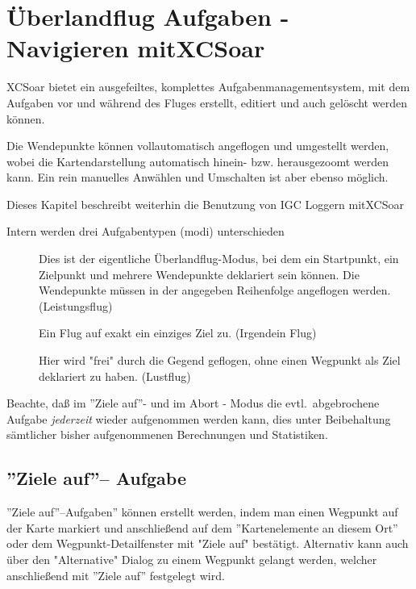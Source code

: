 \setcounter{chapter}{4}
\chapter{Überlandflug Aufgaben - Navigieren mit\textsf{XCSoar}}\label{cha:tasks}

\textsf{XCSoar} bietet ein ausgefeiltes, komplettes Aufgabenmanagementsystem, mit dem Aufgaben vor und während des Fluges erstellt, editiert und auch gelöscht werden können.

Die Wendepunkte können vollautomatisch angeflogen und umgestellt werden, wobei die Kartendarstellung automatisch hinein- bzw. herausgezoomt werden kann. Ein rein manuelles  Anwählen und Umschalten ist aber ebenso möglich.

Dieses Kapitel beschreibt weiterhin die Benutzung von \textsf{IGC} Loggern mit\textsf{XCSoar}

Intern werden drei Aufgabentypen (modi)  unterschieden
\begin{description}
\item[] Dies ist der eigentliche Überlandflug-Modus, bei dem ein Startpunkt, ein
    Zielpunkt und mehrere Wendepunkte deklariert sein können. Die Wendepunkte müssen in der
    angegeben Reihenfolge angeflogen werden. (Leistungsflug)
\item[] Ein Flug auf exakt ein einziges Ziel zu. (Irgendein Flug)
\item[] Hier wird "frei" durch die Gegend geflogen, ohne einen Wegpunkt als  Ziel
    deklariert zu haben. (Lustflug)
\end{description}

 Beachte, daß im ''Ziele auf''- und im Abort - Modus  die  evtl.\ abgebrochene Aufgabe \textsl{jederzeit} wieder \tip aufgenommen werden kann, dies unter Beibehaltung sämtlicher bisher aufgenommenen Berechnungen und Statistiken.

\section{''Ziele auf''-- Aufgabe}

''Ziele auf''--Aufgaben'' können erstellt werden, indem man einen Wegpunkt auf der Karte markiert und anschließend auf dem ''Kartenelemente an diesem Ort'' oder dem Wegpunkt-Detailfenster mit "Ziele auf" bestätigt.  Alternativ kann auch über den "Alternative" Dialog zu einem Wegpunkt gelangt werden, welcher anschließend mit ''Ziele auf'' festgelegt wird.

